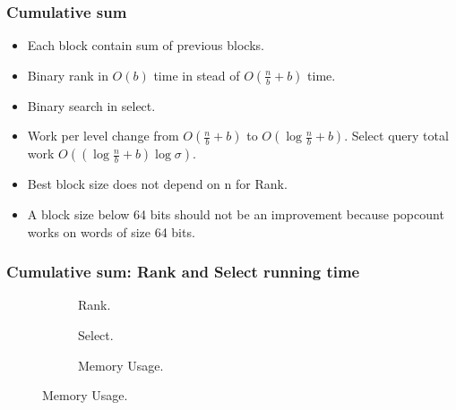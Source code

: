 \documentclass{beamer}
\begin{document}
\begin{frame}
\frametitle{Cumulative sum}
\begin{itemize}
\item Each block contain sum of previous blocks.
\item Binary rank in $O(b)$ time in stead of $O(\frac{n}{b} + b)$ time.
\item Binary search in select.
\item Work per level change from $O(\frac{n}{b} + b)$ to $O(\log \frac{n}{b} + b)$. Select query total work $O((\log \frac{n}{b} + b) \log \sigma)$.
\item Best block size does not depend on n for Rank.
\item A block size below 64 bits should not be an improvement because popcount works on words of size 64 bits.
\end{itemize}
\end{frame}


\begin{frame}
\frametitle{Cumulative sum: Rank and Select running time}
\begin{figure}\tiny
\begin{subfigure}{0.48\textwidth}
	\scalebox{0.5}{}
	\caption{Rank.}
\end{subfigure}
\hfill
\begin{subfigure}{0.48\textwidth}
	\scalebox{0.5}{}
	\caption{Select.}
\end{subfigure}

\begin{subfigure}{0.48\textwidth}
	\scalebox{0.5}{}
	\caption{Memory Usage.}
\end{subfigure}
\end{figure}
\end{frame}
\end{document}
